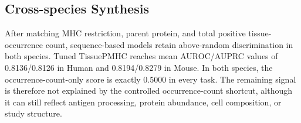 \subsection{Cross-species Synthesis}

After matching MHC restriction, parent protein, and total positive tissue-occurrence count, sequence-based models retain above-random discrimination in both species. Tuned TissuePMHC reaches mean AUROC/AUPRC values of 0.8136/0.8126 in Human and 0.8194/0.8279 in Mouse. In both species, the occurrence-count-only score is exactly 0.5000 in every task. The remaining signal is therefore not explained by the controlled occurrence-count shortcut, although it can still reflect antigen processing, protein abundance, cell composition, or study structure.
